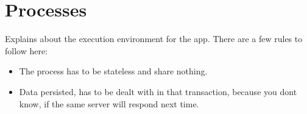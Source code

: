 \section*{Processes}
Explains about the execution environment for the app.
There are a few rules to follow here:

\begin{itemize}
\item The process has to be stateless and share nothing.
\item Data persisted, has to be dealt with in that transaction, because you dont know, if the same server will respond next time.
\end{itemize}
 